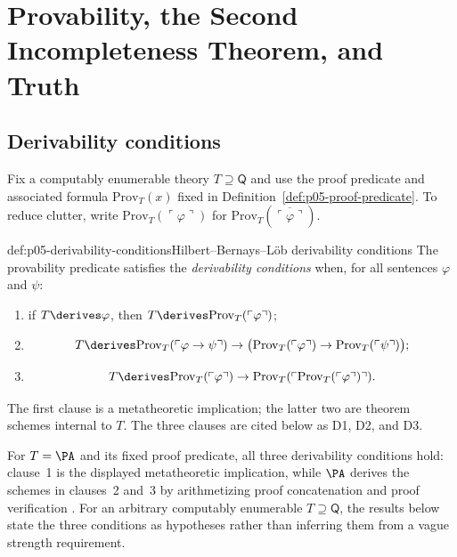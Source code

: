 \chapter{Provability, the Second Incompleteness Theorem, and Truth}
\label{sec:p05-provability-truth}

\section{Derivability conditions}
\label{sec:p05-provability-truth-01}

Fix a computably enumerable theory \(T\supseteq\mathsf Q\) and use the
proof predicate and associated formula \(\mathrm{Prov}_T(x)\) fixed in
Definition~\ref{def:p05-proof-predicate}.  To reduce clutter, write
\(\mathrm{Prov}_T(\ulcorner\varphi\urcorner)\) for
\(\mathrm{Prov}_T(\overline{\ulcorner\varphi\urcorner})\).

\begin{hbdefinition}{def:p05-derivability-conditions}{Hilbert--Bernays--L\"ob derivability conditions}
The provability predicate satisfies the \emph{derivability conditions}
when, for all sentences \(\varphi\) and \(\psi\):
\begin{enumerate}
  \item if \(T\derives\varphi\), then
        \(T\derives\mathrm{Prov}_T(\ulcorner\varphi\urcorner)\);
  \item
  \[
    T\derives
    \mathrm{Prov}_T(\ulcorner\varphi\to\psi\urcorner)
    \to
    \bigl(\mathrm{Prov}_T(\ulcorner\varphi\urcorner)
    \to\mathrm{Prov}_T(\ulcorner\psi\urcorner)\bigr);
  \]
  \item
  \[
    T\derives
    \mathrm{Prov}_T(\ulcorner\varphi\urcorner)
    \to
    \mathrm{Prov}_T
    (\ulcorner\mathrm{Prov}_T(\ulcorner\varphi\urcorner)\urcorner).
  \]
\end{enumerate}
The first clause is a metatheoretic implication; the latter two are
theorem schemes internal to \(T\).  The three clauses are cited below as
D1, D2, and D3.
\end{hbdefinition}

For \(T=\PA\) and its fixed proof predicate, all three derivability
conditions hold: clause~1 is the displayed metatheoretic implication,
while \(\PA\) derives the schemes in clauses~2 and~3 by arithmetizing
proof concatenation and proof verification
\cite{HilbertBernays1939,Lob1955}.  For an arbitrary computably
enumerable \(T\supseteq\mathsf Q\), the results below state the three
conditions as hypotheses rather than inferring them from a vague strength
requirement.

